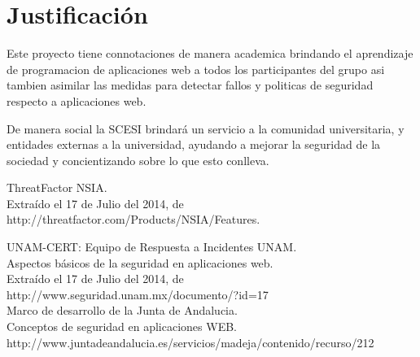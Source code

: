 \documentclass[letter,twoside,11pt]{article}
\begin{document}
\section{Justificación}
Este proyecto tiene connotaciones de manera academica brindando el aprendizaje
de programacion de aplicaciones web a todos los participantes del grupo asi
tambien asimilar las medidas para detectar fallos y politicas de seguridad
respecto a aplicaciones web.

De manera social la SCESI brindará un servicio a la comunidad universitaria, y
entidades externas a la universidad, ayudando a mejorar la seguridad de la
sociedad y concientizando sobre lo que esto conlleva.

\begin{thebibliography}{99}

     ThreatFactor NSIA.\\
    Extraído el 17 de Julio del 2014, de\\
    http://threatfactor.com/Products/NSIA/Features.

     UNAM-CERT: Equipo de Respuesta a Incidentes UNAM.\\
    Aspectos básicos de la seguridad en aplicaciones web.\\
    Extraído el 17 de Julio del 2014, de\\
    http://www.seguridad.unam.mx/documento/?id=17\\

     Marco de desarrollo de la Junta de Andalucia.\\
    Conceptos de seguridad en aplicaciones WEB.\\
    http://www.juntadeandalucia.es/servicios/madeja/contenido/recurso/212\\
\end{thebibliography}
\end{document}
